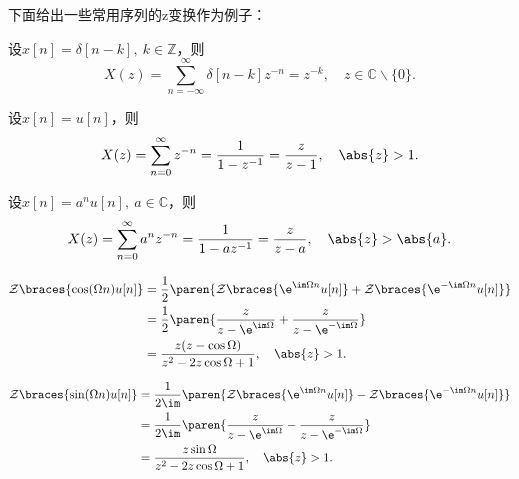 下面给出一些常用序列的z变换作为例子：
\begin{example}[单位脉冲序列的z变换]
    设$x[n]=\delta[n-k],\ k\in\mathbb{Z}$，则
    \begin{equation}
        X(z)=\sum_{n=-\infty}^{\infty}\delta[n-k]z^{-n}=z^{-k},\quad z\in\mathbb{C}\backslash\{0\}.
    \end{equation}
\end{example}
\begin{example}[单位阶跃序列的z变换]
    设$x[n]=u[n]$，则
    \begin{equation}
        X(z)=\sum_{n=0}^{\infty}z^{-n}=\frac{1}{1-z^{-1}}=\frac{z}{z-1},\quad \abs{z}>1.
    \end{equation}
\end{example}
\begin{example}[指数序列的z变换]
    设$x[n]=a^n u[n],\ a\in\mathbb{C}$，则
    \begin{equation}
        X(z)=\sum_{n=0}^{\infty}a^n z^{-n}=\frac{1}{1-a z^{-1}}=\frac{z}{z-a},\quad \abs{z}>\abs{a}.
    \end{equation}
\end{example}
\begin{example}[单边余弦序列的z变换]\label{exmp:causual_cos_z}
    \begin{align}
        \mathcal{Z}\braces{\cos(\Omega n)u[n]} & =\frac{1}{2}\paren{\mathcal{Z}\braces{\e^{\im\Omega n}u[n]}+\mathcal{Z}\braces{\e^{-\im\Omega n}u[n]}}\nonumber \\
                                               & =\frac{1}{2}\paren{\frac{z}{z-\e^{\im\Omega}}+\frac{z}{z-\e^{-\im\Omega}}}\nonumber                             \\
                                               & =\frac{z(z-\cos\Omega)}{z^2-2z\cos\Omega+1},\quad \abs{z}>1.
    \end{align}
\end{example}
\begin{example}[单边正弦序列的z变换]\label{exmp:casual_sin_z}
    \begin{align}
        \mathcal{Z}\braces{\sin(\Omega n)u[n]} & =\frac{1}{2\im}\paren{\mathcal{Z}\braces{\e^{\im\Omega n}u[n]}-\mathcal{Z}\braces{\e^{-\im\Omega n}u[n]}}\nonumber \\
                                               & =\frac{1}{2\im}\paren{\frac{z}{z-\e^{\im\Omega}}-\frac{z}{z-\e^{-\im\Omega}}}\nonumber                             \\
                                               & =\frac{z\sin\Omega}{z^2-2z\cos\Omega+1},\quad \abs{z}>1.
    \end{align}
\end{example}


